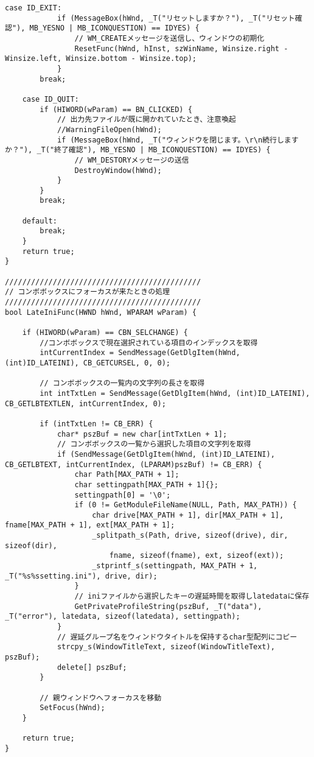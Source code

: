 \begin{lstlisting}[caption=main.cpp]
	case ID_EXIT:
			if (MessageBox(hWnd, _T("リセットしますか？"), _T("リセット確認"), MB_YESNO | MB_ICONQUESTION) == IDYES) {
				// WM_CREATEメッセージを送信し、ウィンドウの初期化
				ResetFunc(hWnd, hInst, szWinName, Winsize.right - Winsize.left, Winsize.bottom - Winsize.top);
			}
		break;

	case ID_QUIT:
		if (HIWORD(wParam) == BN_CLICKED) {
			// 出力先ファイルが既に開かれていたとき、注意喚起
			//WarningFileOpen(hWnd);
			if (MessageBox(hWnd, _T("ウィンドウを閉じます。\r\n続行しますか？"), _T("終了確認"), MB_YESNO | MB_ICONQUESTION) == IDYES) {
				// WM_DESTORYメッセージの送信
				DestroyWindow(hWnd);
			}
		}
		break;
	
	default:
		break;
	}
	return true;
}

/////////////////////////////////////////////
// コンボボックスにフォーカスが来たときの処理
/////////////////////////////////////////////
bool LateIniFunc(HWND hWnd, WPARAM wParam) {

	if (HIWORD(wParam) == CBN_SELCHANGE) {
		//コンボボックスで現在選択されている項目のインデックスを取得
		intCurrentIndex = SendMessage(GetDlgItem(hWnd, (int)ID_LATEINI), CB_GETCURSEL, 0, 0);
		
		// コンボボックスの一覧内の文字列の長さを取得
		int intTxtLen = SendMessage(GetDlgItem(hWnd, (int)ID_LATEINI), CB_GETLBTEXTLEN, intCurrentIndex, 0);

		if (intTxtLen != CB_ERR) {
			char* pszBuf = new char[intTxtLen + 1];
			// コンボボックスの一覧から選択した項目の文字列を取得
			if (SendMessage(GetDlgItem(hWnd, (int)ID_LATEINI), CB_GETLBTEXT, intCurrentIndex, (LPARAM)pszBuf) != CB_ERR) {
				char Path[MAX_PATH + 1];
				char settingpath[MAX_PATH + 1]{};
				settingpath[0] = '\0';
				if (0 != GetModuleFileName(NULL, Path, MAX_PATH)) {
					char drive[MAX_PATH + 1], dir[MAX_PATH + 1], fname[MAX_PATH + 1], ext[MAX_PATH + 1];
					_splitpath_s(Path, drive, sizeof(drive), dir, sizeof(dir),
						fname, sizeof(fname), ext, sizeof(ext));
					_stprintf_s(settingpath, MAX_PATH + 1, _T("%s%ssetting.ini"), drive, dir);
				}
				// iniファイルから選択したキーの遅延時間を取得しlatedataに保存
				GetPrivateProfileString(pszBuf, _T("data"), _T("error"), latedata, sizeof(latedata), settingpath);
			}
			// 遅延グループ名をウィンドウタイトルを保持するchar型配列にコピー
			strcpy_s(WindowTitleText, sizeof(WindowTitleText), pszBuf);
			delete[] pszBuf;
		}

		// 親ウィンドウへフォーカスを移動
		SetFocus(hWnd);
	}
	
	return true;
}


\end{lstlisting}

